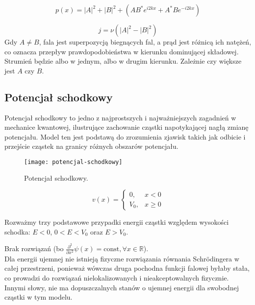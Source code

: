 
\begin{equation*}
    p(x) = \left| A \right|^2 + \left| B \right|^2 + \left( A B^* e^{i 2kx} + A^* B e^{-i 2kx} \right)
\end{equation*}

\begin{equation*}
    j = \nu \left( \left| A \right|^2 - \left| B \right|^2 \right)
\end{equation*}
Gdy $A \neq B$, fala jest superpozycją biegnących fal, a prąd jest różnicą ich natężeń, co oznacza przepływ prawdopodobieństwa w kierunku dominującej składowej.
Strumień będzie albo w jednym, albo w drugim kierunku. Zależnie czy większe jest $A$ czy $B$. \\




\subsection{Potencjał schodkowy}

Potencjał schodkowy to jedno z najprostszych i najważniejszych zagadnień w mechanice kwantowej, ilustrujące zachowanie
cząstki napotykającej nagłą zmianę potencjału. Model ten jest podstawą do zrozumienia zjawisk takich jak odbicie i
przejście cząstek na granicy różnych obszarów potencjału.

\begin{figure}[H]
    \centering
    \texttt{[image: potencjal-schodkowy]}
    \caption{Potencjał schodkowy.}
    \label{fig:potencjal-schodkowy}
\end{figure}



\begin{equation*}
    v(x) = 
    \begin{cases}
        0, & x < 0 \\
        V_0, & x \geq 0
    \end{cases}
\end{equation*}

Rozważmy trzy podstawowe przypadki energii cząstki względem wysokości schodka: $E<0$, $0<E<V_0$ oraz $E>V_0$.


Brak rozwiązań (bo $\frac{\partial^2}{\partial x^2} \psi(x) = \text{const}, \forall x \in \mathbb{R}$). \\
Dla energii ujemnej nie istnieją fizyczne rozwiązania równania Schrödingera w całej przestrzeni,
ponieważ wówczas druga pochodna funkcji falowej byłaby stała, co prowadzi do rozwiązań nielokalizowanych i
nieakceptowalnych fizycznie. Innymi słowy, nie ma dopuszczalnych stanów o ujemnej energii dla swobodnej cząstki w tym modelu.


